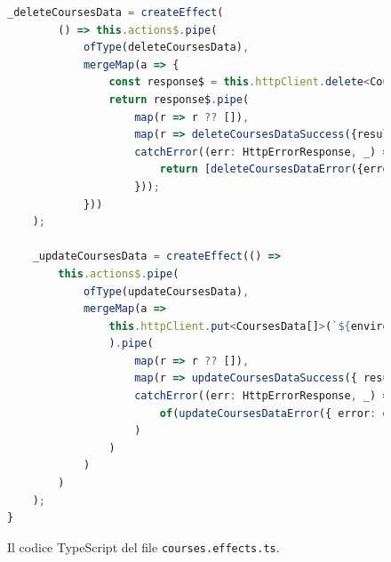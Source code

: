 \begin{figure}[H]
\begin{lstlisting}[language=TypeScript, linewidth=20cm, basicstyle=\tiny]
    _deleteCoursesData = createEffect(
        () => this.actions$.pipe(
            ofType(deleteCoursesData),
            mergeMap(a => {
                const response$ = this.httpClient.delete<CoursesData[]>(`${environment.apiUrl}/courses/deleteCoursesData/${a.item.coursesId}` , { responseType: ' json'});
                return response$.pipe(
                    map(r => r ?? []),
                    map(r => deleteCoursesDataSuccess({result: r, _id: a._id })),
                    catchError((err: HttpErrorResponse, _) => {
                        return [deleteCoursesDataError({error: err.message, _id: a._id})];
                    }));
            }))
    );

    _updateCoursesData = createEffect(() =>
        this.actions$.pipe(
            ofType(updateCoursesData),
            mergeMap(a => 
                this.httpClient.put<CoursesData[]>(`${environment.apiUrl}/courses/updateCoursesData`, [a.item], { responseType: 'json' }
                ).pipe(
                    map(r => r ?? []),
                    map(r => updateCoursesDataSuccess({ result: r, _id: a._id })),
                    catchError((err: HttpErrorResponse, _) =>
                        of(updateCoursesDataError({ error: err.message, _id: a._id }))
                    )
                )
            )
        )
    );
}
\end{lstlisting}
\caption{\label{fig:courses.effects}Il codice TypeScript del file \texttt{courses.effects.ts}.}
\end{figure}

